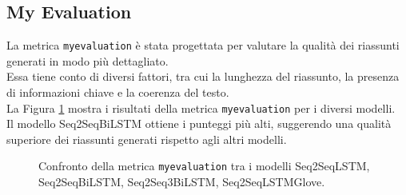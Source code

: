\subsection{My Evaluation}
La metrica \texttt{myevaluation} \`e stata progettata per valutare la qualit\`a dei riassunti generati in modo pi\`u dettagliato.\\
Essa tiene conto di diversi fattori, tra cui la lunghezza del riassunto, la presenza di informazioni chiave e la coerenza del testo.\\
La Figura \ref{fig:myevaluation_comparison} mostra i risultati della metrica \texttt{myevaluation} per i diversi modelli.\\
Il modello Seq2SeqBiLSTM ottiene i punteggi pi\`u alti, suggerendo una qualit\`a superiore dei riassunti generati rispetto agli altri modelli.
\begin{figure}[H]
    \centering
    \hfill
    \hfill
    \hfill
    
    \caption{Confronto della metrica \texttt{myevaluation} tra i modelli Seq2SeqLSTM, Seq2SeqBiLSTM, Seq2Seq3BiLSTM, Seq2SeqLSTMGlove.}
    \label{fig:myevaluation_comparison}
\end{figure}